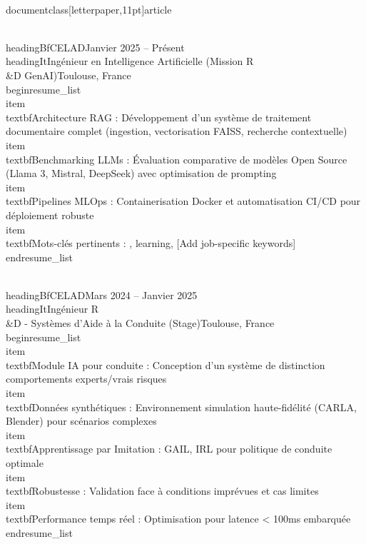 \\documentclass[letterpaper,11pt]{article}
\begin{document}
\\headingBf{CELAD}{Janvier 2025 -- Présent}
\\headingIt{Ingénieur en Intelligence Artificielle (Mission R\\&D GenAI)}{Toulouse, France}
\\begin{resume_list}
  \\item \\textbf{Architecture RAG :} Développement d'un système de traitement documentaire complet (ingestion, vectorisation FAISS, recherche contextuelle)
  \\item \\textbf{Benchmarking LLMs :} Évaluation comparative de modèles Open Source (Llama 3, Mistral, DeepSeek) avec optimisation de prompting
  \\item \\textbf{Pipelines MLOps :} Containerisation Docker et automatisation CI/CD pour déploiement robuste
  \\item \\textbf{Mots-clés pertinents :} \optimization, \deep learning, [Add job-specific keywords]
\\end{resume_list}

\\headingBf{CELAD}{Mars 2024 -- Janvier 2025}
\\headingIt{Ingénieur R\\&D - Systèmes d'Aide à la Conduite (Stage)}{Toulouse, France}
\\begin{resume_list}
  \\item \\textbf{Module IA pour conduite :} Conception d'un système de distinction comportements experts/vrais risques
  \\item \\textbf{Données synthétiques :} Environnement simulation haute-fidélité (CARLA, Blender) pour scénarios complexes
  \\item \\textbf{Apprentissage par Imitation :} GAIL, IRL pour politique de conduite optimale
  \\item \\textbf{Robustesse :} Validation face à conditions imprévues et cas limites
  \\item \\textbf{Performance temps réel :} Optimisation pour latence < 100ms embarquée
\\end{resume_list}
\end{document}
